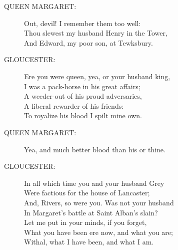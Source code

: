 \documentclass{article}
\begin{document}
\begin{description}
\item[QUEEN MARGARET:] 
\hspace{1pt}Out, devil! I remember them too well:\\
\hspace{1pt}Thou slewest my husband Henry in the Tower,\\
\hspace{1pt}And Edward, my poor son, at Tewksbury.\\
\end{description}
\begin{description}
\item[GLOUCESTER:] 
\hspace{1pt}Ere you were queen, yea, or your husband king,\\
\hspace{1pt}I was a pack-horse in his great affairs;\\
\hspace{1pt}A weeder-out of his proud adversaries,\\
\hspace{1pt}A liberal rewarder of his friends:\\
\hspace{1pt}To royalize his blood I spilt mine own.\\
\end{description}
\begin{description}
\item[QUEEN MARGARET:] 
\hspace{1pt}Yea, and much better blood than his or thine.\\
\end{description}
\begin{description}
\item[GLOUCESTER:] 
\hspace{1pt}In all which time you and your husband Grey\\
\hspace{1pt}Were factious for the house of Lancaster;\\
\hspace{1pt}And, Rivers, so were you. Was not your husband\\
\hspace{1pt}In Margaret's battle at Saint Alban's slain?\\
\hspace{1pt}Let me put in your minds, if you forget,\\
\hspace{1pt}What you have been ere now, and what you are;\\
\hspace{1pt}Withal, what I have been, and what I am.\\
\end{description}
\end{document}
